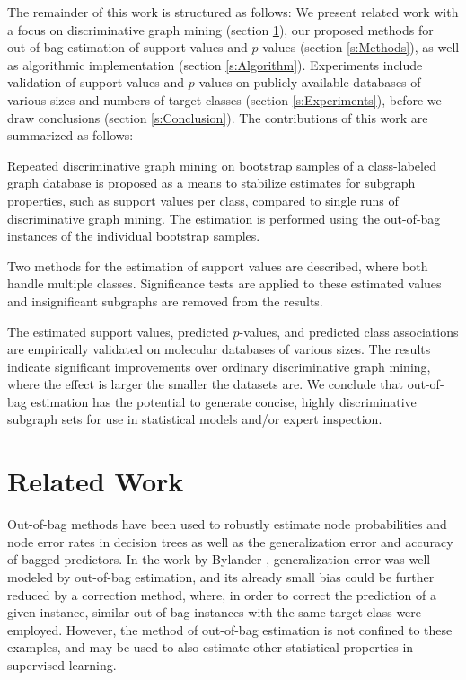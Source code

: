 \documentclass{article}
\begin{document}
The remainder of this work is structured as follows: We present related work
with a focus on discriminative graph mining (section \ref{s:relatedWork}),
our proposed methods for out-of-bag estimation of support values and $p$-values (section
\ref{s:Methods}), as well as algorithmic implementation
(section \ref{s:Algorithm}). Experiments include validation of support
values and $p$-values on publicly available databases of
various sizes and numbers of target classes (section \ref{s:Experiments}),
before we draw conclusions (section \ref{s:Conclusion}).
The contributions of this work are summarized as follows:
\begin{itemize*}
  \item Repeated discriminative graph mining on bootstrap samples of a
    class-labeled graph database is proposed as a means to stabilize estimates
    for subgraph properties, such as support values per class, compared to
    single runs of discriminative graph mining. The estimation is performed
    using the out-of-bag instances of the individual bootstrap samples.
  \item Two methods for the estimation of support values are described, where both
    handle multiple classes. Significance tests are applied to these
    estimated values and insignificant subgraphs are removed from the results.  
  \item The estimated support values, predicted $p$-values, and predicted class
    associations are empirically validated on molecular databases of various
    sizes.  The results indicate significant improvements over 
    ordinary discriminative graph mining, where the effect is larger the
    smaller the datasets are.  We conclude that out-of-bag estimation has the
    potential to generate concise, highly discriminative subgraph sets for
    use in statistical models and/or expert inspection.
\end{itemize*}


\section{Related Work}
\label{s:relatedWork}

Out-of-bag methods have been used to robustly estimate node probabilities and
node error rates in decision trees \cite{breiman96oob} as well as the
generalization error and accuracy of bagged predictors. In the work by Bylander
\cite{bylander02estimating}, generalization error was well modeled by
out-of-bag estimation, and its already small bias could be further reduced by a
correction method, where, in order to correct the prediction of a given
instance, similar out-of-bag instances with the same target class were
employed. However, the method of out-of-bag estimation is not confined to these
examples, and may be used to also estimate other statistical properties in
supervised learning.
\end{document}
